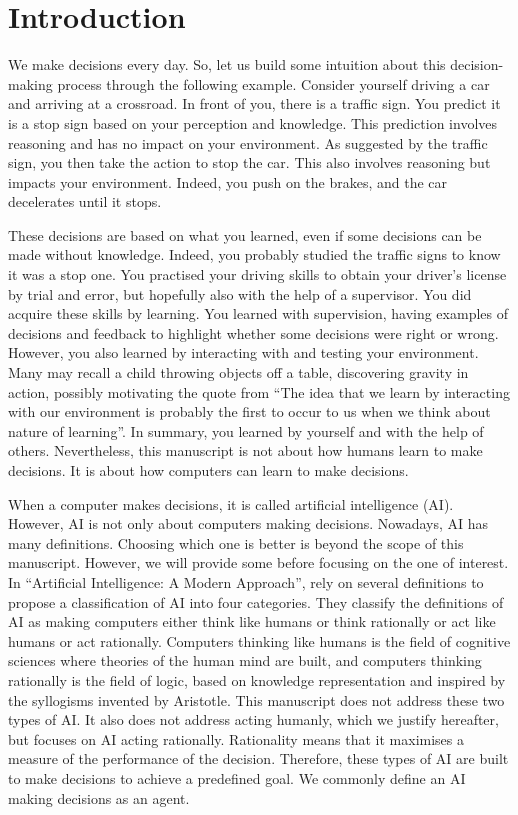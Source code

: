 \chapter{Introduction}\label{ch:introduction}

We make decisions every day.
So, let us build some intuition about this decision-making process through the following example.
Consider yourself driving a car and arriving at a crossroad.
In front of you, there is a traffic sign.
You predict it is a stop sign based on your perception and knowledge.
This prediction involves reasoning and has no impact on your environment.
As suggested by the traffic sign, you then take the action to stop the car.
This also involves reasoning but impacts your environment.
Indeed, you push on the brakes, and the car decelerates until it stops.

These decisions are based on what you learned, even if some decisions can be made without knowledge.
Indeed, you probably studied the traffic signs to know it was a stop one.
You practised your driving skills to obtain your driver's license by trial and error, but hopefully also with the help of a supervisor.
You did acquire these skills by learning.
You learned with supervision, having examples of decisions and feedback to highlight whether some decisions were right or wrong.
However, you also learned by interacting with and testing your environment.
Many may recall a child throwing objects off a table, discovering gravity in action, possibly motivating the quote from \cite{sutton2018reinforcement} ``The idea that we learn by interacting with our environment is probably the first to occur to us when we think about nature of learning''.
In summary, you learned by yourself and with the help of others.
Nevertheless, this manuscript is not about how humans learn to make decisions.
It is about how computers can learn to make decisions.

When a computer makes decisions, it is called artificial intelligence (AI).
However, AI is not only about computers making decisions.
Nowadays, AI has many definitions.
Choosing which one is better is beyond the scope of this manuscript.
However, we will provide some before focusing on the one of interest.
In ``Artificial Intelligence: A Modern Approach'', \cite{russel2010} rely on several definitions to propose a classification of AI into four categories.
They classify the definitions of AI as making computers either think like humans or think rationally or act like humans or act rationally.
Computers thinking like humans is the field of cognitive sciences where theories of the human mind are built, and computers thinking rationally is the field of logic, based on knowledge representation and inspired by the syllogisms invented by Aristotle.
This manuscript does not address these two types of AI.
It also does not address acting humanly, which we justify hereafter, but focuses on AI acting rationally.
Rationality means that it maximises a measure of the performance of the decision.
Therefore, these types of AI are built to make decisions to achieve a predefined goal.
We commonly define an AI making decisions as an agent.

